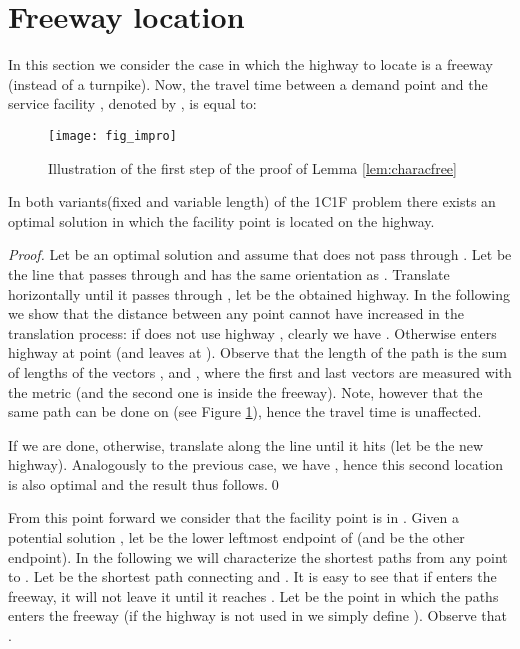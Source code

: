 \documentclass{llncs}
\begin{document}
\section{Freeway location}


In this section we consider the case in which the highway to locate is a freeway (instead of a turnpike).
Now, the travel time between a demand point  and the
service facility , denoted by , is equal to:





\begin{figure}[h]
    \centering
    \texttt{[image: fig\_impro]}
    \caption{Illustration of the first step of the proof of Lemma \ref{lem:characfree}}
    \label{fig_impro}
\end{figure}
\begin{lemma}\label{lem:characfree}
In both variants(fixed and variable length) of the 1C1F problem  there exists an optimal solution in which the facility point is located on the highway.
\end{lemma}
\begin{proof}
Let  be an optimal solution and assume that  does not pass through . Let  be the line that passes through  and has the same orientation as . Translate  horizontally until it passes through , let  be the obtained highway. In the following we show that the distance between any point  cannot have increased in the translation process: if  does not use highway , clearly we have . Otherwise  enters highway  at point  (and leaves  at ). Observe that the length of the path is the sum of lengths of the vectors , and , where the first and last  vectors are measured with the  metric (and the second one is inside the freeway). Note, however that the same path can be done on  (see Figure \ref{fig_impro}), hence the travel time is unaffected.

If  we are done, otherwise, translate  along the line  until it hits  (let  be the new highway). Analogously to the previous case, we have , hence this second location is also optimal and the result thus follows.\qed
\end{proof}



From this point forward we consider that the facility point  is in . Given a potential solution , let  be the lower leftmost endpoint of  (and  be the other endpoint). In the following we will characterize the shortest paths from any point  to . Let  be the shortest path connecting  and . It is easy to see that if  enters the freeway, it will not leave it until it reaches . Let  be the point in which the paths enters the freeway (if the highway is not used in  we simply define ). Observe that .
\end{document}
